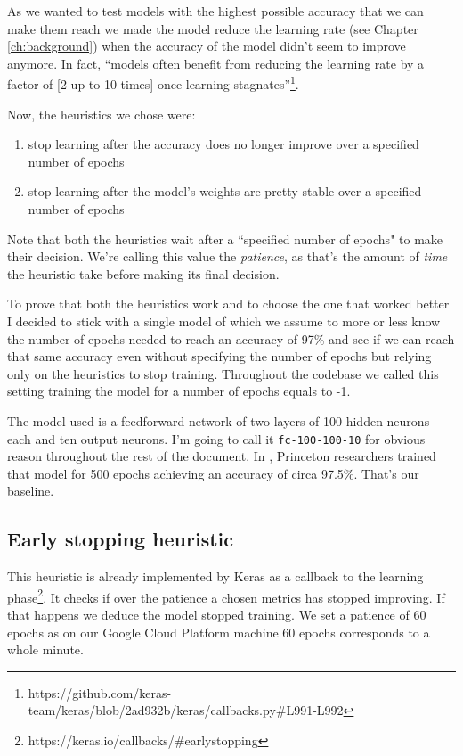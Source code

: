 As we wanted to test models with the highest possible accuracy that we
can make them reach we made the model reduce the learning rate
(see Chapter \ref{ch:background}) when the accuracy of the model didn't
seem to improve anymore. In fact, ``models often benefit from reducing
the learning rate by a factor of [2 up to 10 times] once learning
stagnates''\footnote{https://github.com/keras-team/keras/blob/2ad932b/keras/callbacks.py\#L991-L992}.

Now, the heuristics we chose were:
\begin{enumerate}
  \item stop learning after the accuracy does no longer improve over a
    specified number of epochs
  \item stop learning after the model's weights are pretty stable over a
    specified number of epochs
\end{enumerate}

Note that both the heuristics wait after a ``specified number of
epochs" to make their decision. We're calling this value the
\emph{patience}, as that's the amount of \emph{time} the heuristic take
before making its final decision.

To prove that both the heuristics work and to choose the one that
worked better I decided to stick with a single model of which we assume
to more or less know the number of epochs needed to reach an accuracy
of 97\% and see if we can reach that same accuracy even without
specifying the number of epochs but relying only on the heuristics to
stop training. Throughout the codebase we called this setting training
the model for a number of epochs equals to -1.

The model used is a feedforward network of two layers of 100 hidden
neurons each and ten output neurons. I'm going to call it
\texttt{fc-100-100-10} for obvious reason throughout the rest of the
document. In \cite{bhagoji2018enhancing}, Princeton researchers trained
that model for 500 epochs achieving an accuracy of circa 97.5\%. That's our
baseline.

\subsection{Early stopping heuristic}
This heuristic is already implemented by Keras as a callback to the
learning phase\footnote{https://keras.io/callbacks/\#earlystopping}. It
checks if over the patience a chosen metrics has stopped improving. If
that happens we deduce the model stopped training. We set a patience of
60 epochs as on our Google Cloud Platform machine 60 epochs corresponds
to a whole minute.

